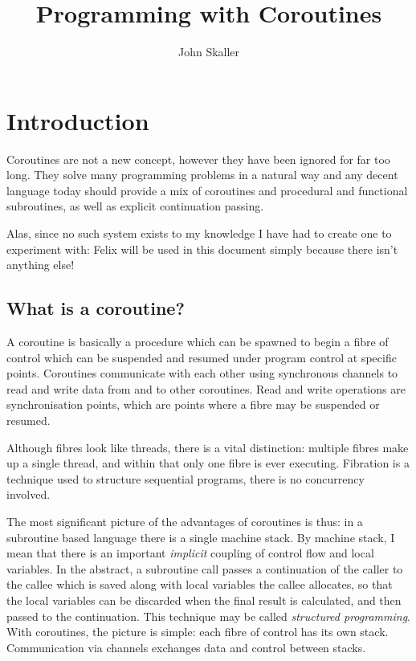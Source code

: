 \documentclass[oneside]{book}
\title{Programming with Coroutines}
\author{John Skaller}
\begin{document}
\maketitle
\tableofcontents
\chapter{Introduction}
Coroutines are not a new concept, however they have been ignored for
far too long. They solve many programming problems in a natural way and
any decent language today should provide a mix of coroutines and procedural
and functional subroutines, as well as explicit continuation passing.

Alas, since no such system exists to my knowledge I have had to create
one to experiment with: Felix will be used in this document simply
because there isn't anything else!

\section{What is a coroutine?}
A coroutine is basically a procedure which can be spawned to begin
a fibre of control which can be suspended and resumed under program
control at specific points. Coroutines communicate with each other
using synchronous channels to read and write data from and to other
coroutines. Read and write operations are synchronisation points,
which are points where a fibre may be suspended or resumed.

Although fibres look like threads, there is a vital distinction: multiple
fibres make up a single thread, and within that only one fibre is ever
executing. Fibration is a technique used to structure sequential programs,
there is no concurrency involved.

The most significant picture of the advantages of coroutines is thus: in a subroutine
based language there is a single machine stack. By machine stack, I mean that
there is an important {\em implicit} coupling of control flow and local variables.
In the abstract, a subroutine call passes a continuation of the caller to 
the callee which is saved along with local variables the callee allocates,
so that the local variables can be discarded when the final result is
calculated, and then passed to the continuation. This technique may be
called {\em structured programming}. With coroutines, the picture is simple:
each fibre of control has its own stack. Communication via channels exchanges data
and control between stacks.
\end{document}
